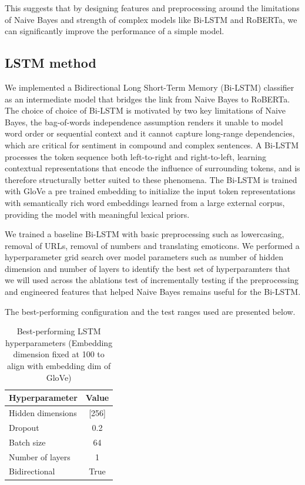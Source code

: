 \documentclass[11pt]{article}
\begin{document}
This suggests that by designing features and preprocessing around the limitations of Naive Bayes and strength of complex models like Bi-LSTM and RoBERTa, we can significantly improve the performance of a simple model.

\subsection{LSTM method}

We implemented a Bidirectional Long Short-Term Memory (Bi-LSTM) classifier as an intermediate model that bridges the link from Naive Bayes to RoBERTa. 
The choice of choice of Bi-LSTM is motivated by two key limitations of Naive Bayes, 
the bag-of-words independence assumption renders it unable to model word order or sequential context and it cannot capture long-range dependencies, which are critical for sentiment in compound and complex sentences.
A Bi-LSTM processes the token sequence both left-to-right and right-to-left, learning contextual representations that encode the influence of surrounding tokens, and is therefore structurally better 
suited to these phenomena. The Bi-LSTM is trained with GloVe a pre trained embedding to initialize the input token representations with semantically rich word embeddings learned from a large external corpus, providing the model with meaningful lexical priors.

We trained a baseline Bi-LSTM with basic preprocessing such as lowercasing, removal of URLs, removal of numbers and translating emoticons. 
We performed a hyperparameter grid search over model parameters such as number of hidden dimension and number of layers to identify the best
set of hyperparamters that we will used across the ablations test of incrementally testing if the preprocessing and engineered features that helped Naive Bayes remains useful for the Bi-LSTM.

The best-performing configuration and the test ranges used are presented below.
\begin{table}[h]
\centering
\begin{tabular}{lc}
\hline
\textbf{Hyperparameter} & \textbf{Value} \\
\hline
Hidden dimensions & [256] \\
Dropout & 0.2  \\
Batch size & 64 \\
Number of layers & 1 \\
Bidirectional & True \\
\hline
\end{tabular}
\caption{Best-performing LSTM hyperparameters (Embedding dimension fixed at 100 to align with embedding dim of GloVe)}
\end{table}
\end{document}
